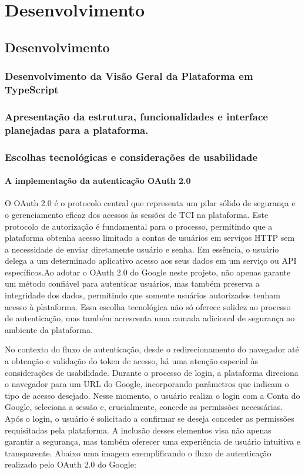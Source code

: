 \part{Desenvolvimento}
\chapter{Desenvolvimento}

\section{Desenvolvimento da Visão Geral da Plataforma em TypeScript}
\section{Apresentação da estrutura, funcionalidades e interface planejadas para a plataforma.}
\section{Escolhas tecnológicas e considerações de usabilidade}
\subsection{A implementação da autenticação OAuth 2.0}
O OAuth 2.0 é o protocolo central que representa um pilar sólido de segurança e o gerenciamento eficaz dos acessos às sessões de TCI na plataforma. Este protocolo de autorização é fundamental para o processo, permitindo que a plataforma obtenha acesso limitado a contas de usuários em serviços HTTP sem a necessidade de enviar diretamente usuário e senha. Em essência, o usuário delega a um determinado aplicativo acesso aos seus dados em um serviço ou API específicos.\cite{OAUTH}Ao adotar o OAuth 2.0 do Google neste projeto, não apenas garante um método confiável para autenticar usuários, mas também preserva a integridade dos dados, permitindo que somente usuários autorizados tenham acesso à plataforma. Essa escolha tecnológica não só oferece solidez ao processo de autenticação, mas também acrescenta uma camada adicional de segurança ao ambiente da plataforma.

No contexto do fluxo de autenticação, desde o redirecionamento do navegador até a obtenção e validação do token de acesso, há uma atenção especial às considerações de usabilidade. Durante o processo de login, a plataforma direciona o navegador para um URL do Google, incorporando parâmetros que indicam o tipo de acesso desejado. Nesse momento, o usuário realiza o login com a Conta do Google, seleciona a sessão e, crucialmente, concede as permissões necessárias. Após o login, o usuário é solicitado a confirmar se deseja conceder as permissões requisitadas pela plataforma. A inclusão desses elementos visa não apenas garantir a segurança, mas também oferecer uma experiência de usuário intuitiva e transparente. Abaixo uma imagem exemplificando o fluxo de autenticação realizado pelo OAuth 2.0 do Google\cite{OAUTHACESS}:

